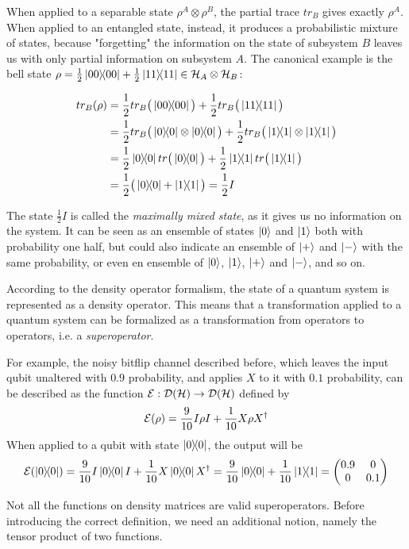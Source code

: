 When applied to a separable state $\rho^A \otimes \rho^B$, the partial trace $tr_B$ gives exactly $\rho^A$. When applied to an entangled state, instead, it produces a probabilistic mixture of states, because "forgetting" the information on the state of subsystem $B$ leaves us with only partial information on subsystem $A$. The canonical example is the bell state $\rho = \frac{1}{2} \ket{00}\!\!\bra{00} + \frac{1}{2}\ket{11}\!\!\bra{11} \in \mathcal{H}_A \otimes \mathcal{H}_B$: 

\begin{align*}
tr_B(\rho) &= \frac{1}{2} tr_B\big(\proj{00}\big) + \frac{1}{2}tr_B\big(\proj{11}\big)  \\
	&= \frac{1}{2} tr_B\big(\proj{0}\otimes\proj{0}\big) + \frac{1}{2}tr_B\big(\proj{1}\otimes\proj{1}\big) \\
	&= \frac{1}{2} \proj{0}tr\big(\proj{0}\big) + \frac{1}{2}\proj{1}tr\big(\proj{1}\big) \\
	&= \frac{1}{2} \big(\proj{0} + \proj{1}\big) = \frac{1}{2}I
\end{align*}


The state $\frac{1}{2}I$ is called the \textit{maximally mixed state}, as it gives us no information on the system. It can be seen as an ensemble of states $\ket{0}$ and $\ket{1}$ both with probability one half, but could also indicate an ensemble of $\ket{+}$ and $\ket{-}$ with the same probability, or even en ensemble of $\ket{0}$, $\ket{1}$, $\ket{+}$ and $\ket{-}$, and so on. 


According to the density operator formalism, the state of a quantum system is represented as a density operator. This means that a transformation applied to a quantum system can be formalized as a transformation from operators to operators, i.e. a \textit{superoperator}.

For example, the noisy bitflip channel described before, which leaves the input qubit unaltered with $0.9$ probability, and applies $X$ to it with $0.1$ probability, can be described as the function $\mathcal{E}: \mathcal{D}(\mathcal{H}) \rightarrow \mathcal{D}(\mathcal{H})$ defined by
\[\mathcal{E}(\rho) = \frac{9}{10} 
I\rho I
+
\frac{1}{10}
X \rho X^\dagger
\]
When applied to a qubit with state $\ket{0}\!\!\bra{0}$, the output will be 
\[\sop(\proj{0}) = \frac{9}{10} I \proj{0} I + \frac{1}{10}X \proj{0} X^\dagger = \frac{9}{10} \proj{0} + \frac{1}{10}\proj{1} = 
\begin{pmatrix} 0.9 & 0 \\ 0 & 0.1 \end{pmatrix} \]

Not all the functions on density matrices are valid superoperators. Before introducing the correct definition, we need an additional notion, namely the tensor product of two functions.


